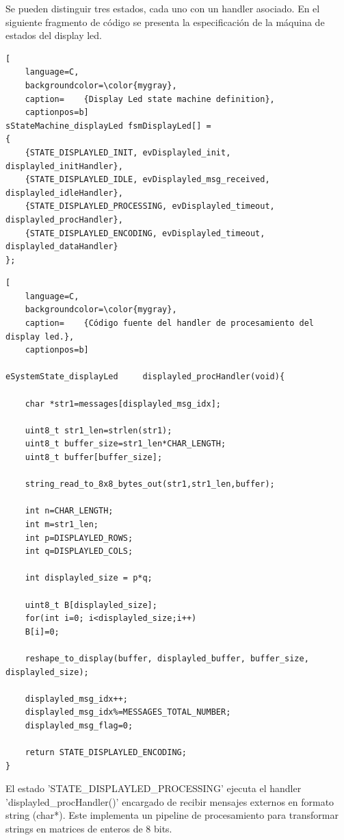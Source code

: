 Se pueden distinguir tres estados, cada uno con un handler asociado. En el siguiente fragmento de código se presenta la especificación de la máquina de estados del display led. \\


\begin{lstlisting}[
	language=C, 
	backgroundcolor=\color{mygray},
	caption=	{Display Led state machine definition},
	captionpos=b]
sStateMachine_displayLed fsmDisplayLed[] = 
{
    {STATE_DISPLAYLED_INIT, evDisplayled_init, displayled_initHandler},
    {STATE_DISPLAYLED_IDLE, evDisplayled_msg_received, displayled_idleHandler},
    {STATE_DISPLAYLED_PROCESSING, evDisplayled_timeout, displayled_procHandler},
    {STATE_DISPLAYLED_ENCODING, evDisplayled_timeout, displayled_dataHandler}
};
\end{lstlisting}
\label{code:fsmDisplay}



\begin{lstlisting}[
	language=C, 
	backgroundcolor=\color{mygray},
	caption=	{Código fuente del handler de procesamiento del display led.},
	captionpos=b]

eSystemState_displayLed     displayled_procHandler(void){

    char *str1=messages[displayled_msg_idx];

    uint8_t str1_len=strlen(str1);
    uint8_t buffer_size=str1_len*CHAR_LENGTH;
    uint8_t buffer[buffer_size];

    string_read_to_8x8_bytes_out(str1,str1_len,buffer);

    int n=CHAR_LENGTH; 
    int m=str1_len;
    int p=DISPLAYLED_ROWS;
    int q=DISPLAYLED_COLS;

    int displayled_size = p*q;

    uint8_t B[displayled_size];
    for(int i=0; i<displayled_size;i++)
    B[i]=0;

    reshape_to_display(buffer, displayled_buffer, buffer_size, displayled_size);

    displayled_msg_idx++;
    displayled_msg_idx%=MESSAGES_TOTAL_NUMBER;
    displayled_msg_flag=0;

    return STATE_DISPLAYLED_ENCODING;
}

\end{lstlisting}

El estado 'STATE\_DISPLAYLED\_PROCESSING' ejecuta el handler  'displayled\_procHandler()' encargado de recibir mensajes externos en formato string (char*). Este implementa un pipeline de procesamiento para transformar strings en matrices de enteros de 8 bits.

